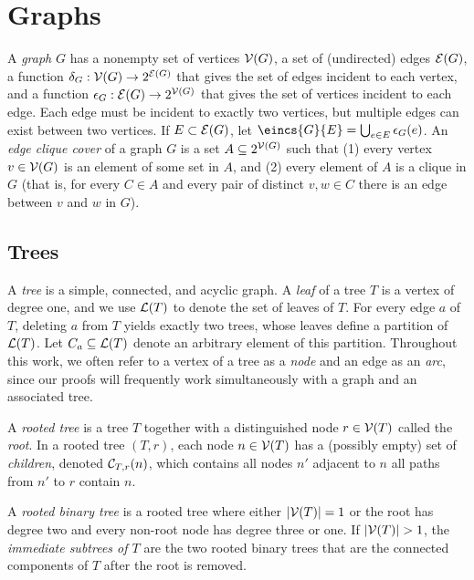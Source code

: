 \section{Graphs}
\label{sec:tensors:prelim}
A \emph{graph} $G$ has a nonempty set of vertices $\mathcal{V}(G)$, a set of (undirected) edges $\mathcal{E}(G)$, a function $\delta_G: \mathcal{V}(G) \rightarrow 2^{\mathcal{E}(G)}$ that gives the set of edges incident to each vertex, and a function $\epsilon_G: \mathcal{E}(G) \rightarrow 2^{\mathcal{V}(G)}$ that gives the set of vertices incident to each edge. Each edge must be incident to exactly two vertices, but multiple edges can exist between two vertices. If $E \subset \mathcal{E}(G)$, let $\eincs{G}{E} = \bigcup_{e \in E} \einc{G}{e}$. %
An \emph{edge clique cover} of a graph $G$ is a set $A \subseteq 2^{\mathcal{V}(G)}$ such that (1) every vertex $v \in \mathcal{V}(G)$ is an element of some set in $A$, and (2) every element of $A$ is a clique in $G$ (that is, for every $C \in A$ and every pair of distinct $v, w \in C$ there is an edge between $v$ and $w$ in $G$).

\subsection{Trees}
A \emph{tree} is a simple, connected, and acyclic graph. A \emph{leaf} of a tree $T$ is a vertex of degree one, and we use $\mathcal{L}(T)$ to denote the set of leaves of $T$. For every edge $a$ of $T$, deleting $a$ from $T$ yields exactly two trees, whose leaves define a partition of $\mathcal{L}(T)$. Let $C_a \subseteq \mathcal{L}(T)$ denote an arbitrary element of this partition. Throughout this work, we often refer to a vertex of a tree as a \emph{node} and an edge as an \emph{arc}, since our proofs will frequently work simultaneously with a graph and an associated tree.

A \emph{rooted tree} is a tree $T$ together with a distinguished node $r \in \mathcal{V}(T)$ called the \emph{root}. 
In a rooted tree $(T, r)$, each node $n \in \mathcal{V}(T)$ has a (possibly empty) set of \emph{children}, denoted $\mathcal{C}_{T,r}(n)$, which contains all nodes $n'$ adjacent to $n$ \st{} all paths from $n'$ to $r$ contain $n$.

A \emph{rooted binary tree} is a rooted tree where either $|\mathcal{V}(T)| = 1$ or the root has degree two and every non-root node has degree three or one. If $|\mathcal{V}(T)| > 1$, the \emph{immediate subtrees of $T$} are the two rooted binary trees that are the connected components of $T$ after the root is removed. 

